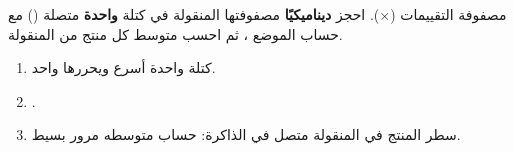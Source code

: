 \begin{statement}
مصفوفة التقييمات  (×). احجز \textbf{ديناميكيًا} مصفوفتها المنقولة \code{[منتج][زبون]} في كتلة \textbf{واحدة} متصلة () مع حساب الموضع ، ثم احسب متوسط كل منتج من المنقولة.
\end{statement}
\begin{stepsbox}\begin{enumerate}
\item كتلة واحدة أسرع ويحررها  واحد.
\item \par{\centering\small{}\par}.
\item سطر المنتج في المنقولة متصل في الذاكرة: حساب متوسطه مرور بسيط.
\end{enumerate}\end{stepsbox}
